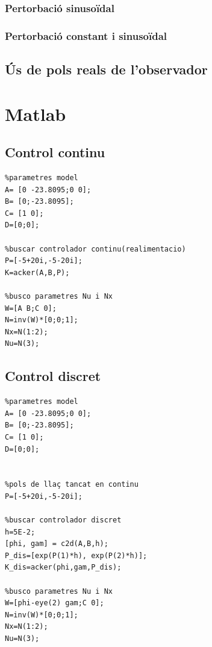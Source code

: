 \documentclass[12pt,a4paper,final,twoside,openright]{report}
\begin{document}
\subsection{Pertorbació sinusoïdal}

\subsection{Pertorbació constant i sinusoïdal}

\section{Ús de pols reals de l'observador}

%


\appendix
\clearpage %
\addappheadtotoc
\appendixpage

\chapter{Matlab}

\section{Control continu}\label{ann:mat_cont}
\begin{verbatim}
%parametres model
A= [0 -23.8095;0 0];
B= [0;-23.8095];
C= [1 0];
D=[0;0];

%buscar controlador continu(realimentacio)
P=[-5+20i,-5-20i];
K=acker(A,B,P);

%busco parametres Nu i Nx
W=[A B;C 0];
N=inv(W)*[0;0;1];
Nx=N(1:2);
Nu=N(3);
\end{verbatim}

\section{Control discret}\label{ann:mat_dis}

\begin{verbatim}
%parametres model
A= [0 -23.8095;0 0];
B= [0;-23.8095];
C= [1 0];
D=[0;0];


%pols de llaç tancat en continu
P=[-5+20i,-5-20i];

%buscar controlador discret
h=5E-2;
[phi, gam] = c2d(A,B,h);
P_dis=[exp(P(1)*h), exp(P(2)*h)];
K_dis=acker(phi,gam,P_dis);

%busco parametres Nu i Nx
W=[phi-eye(2) gam;C 0];
N=inv(W)*[0;0;1];
Nx=N(1:2);
Nu=N(3);
\end{verbatim}
\end{document}
